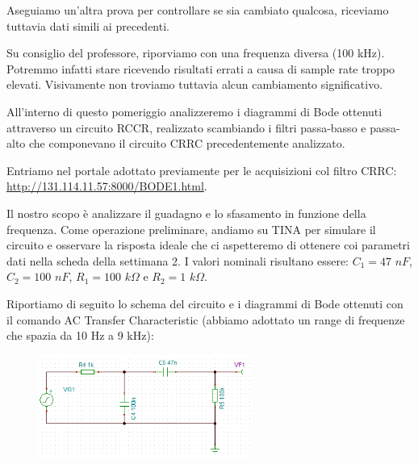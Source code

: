Aseguiamo un'altra prova per controllare se sia cambiato qualcosa, riceviamo tuttavia dati simili ai precedenti.

Su consiglio del professore, riporviamo con una frequenza diversa (100 kHz). Potremmo infatti stare ricevendo risultati errati a causa di sample rate troppo elevati. Visivamente non troviamo tuttavia alcun cambiamento significativo.


All'interno di questo pomeriggio analizzeremo i diagrammi di Bode ottenuti attraverso un circuito RCCR, realizzato scambiando i filtri passa-basso e passa-alto che componevano il circuito CRRC precedentemente analizzato.

Entriamo nel portale adottato previamente per le acquisizioni col filtro CRRC: \textcolor{airforceblue}{\url{http://131.114.11.57:8000/BODE1.html}}.


Il nostro scopo è analizzare il guadagno e lo sfasamento in funzione della frequenza. 
Come operazione preliminare, andiamo su TINA per simulare il circuito e osservare la risposta ideale che ci aspetteremo di ottenere coi parametri dati nella scheda della settimana 2. I valori nominali risultano essere: $C_1 = 47$ $nF$, $C_2 = 100$ $nF$, $R_1 = 100$ $k\Omega$ e $R_2 = 1$ $k\Omega$.


Riportiamo di seguito lo schema del circuito e i diagrammi di Bode ottenuti con il comando AC Transfer Characteristic (abbiamo adottato un range di frequenze che spazia da 10 Hz a 9 kHz):

\begin{figure}[H]
\caption{}
    \includegraphics[width=7cm]{settimana_2/immagini/ImmagineRCCR.png}
    \centering
\end{figure}


